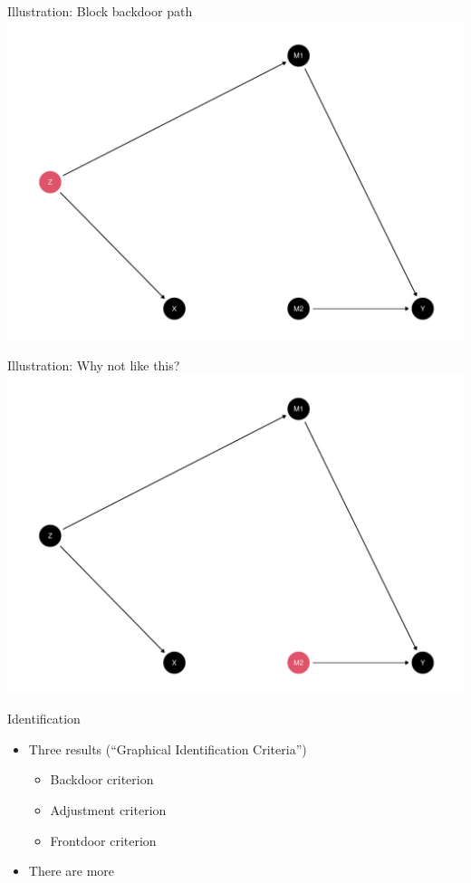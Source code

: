 \documentclass[
  11pt,
  ignorenonframetext,
]{beamer}
\providecommand{\tightlist}{%
  \setlength{\itemsep}{0pt}\setlength{\parskip}{0pt}}\usepackage{longtable,booktabs,array}
\begin{document}
\begin{frame}{Illustration: Block backdoor path}
\protect\hypertarget{illustration-block-backdoor-path}{}
\includegraphics{2.2_estimands_files/figure-beamer/unnamed-chunk-4-1.pdf}
\end{frame}

\begin{frame}{Illustration: Why not like this?}
\protect\hypertarget{illustration-why-not-like-this}{}
\includegraphics{2.2_estimands_files/figure-beamer/unnamed-chunk-5-1.pdf}
\end{frame}

\begin{frame}{Identification}
\protect\hypertarget{identification-2}{}
\begin{itemize}
\tightlist
\item
  Three results (``Graphical Identification Criteria'')

  \begin{itemize}
  \tightlist
  \item
    Backdoor criterion
  \item
    Adjustment criterion
  \item
    Frontdoor criterion
  \end{itemize}
\item
  There are more
\end{itemize}
\end{frame}
\end{document}
